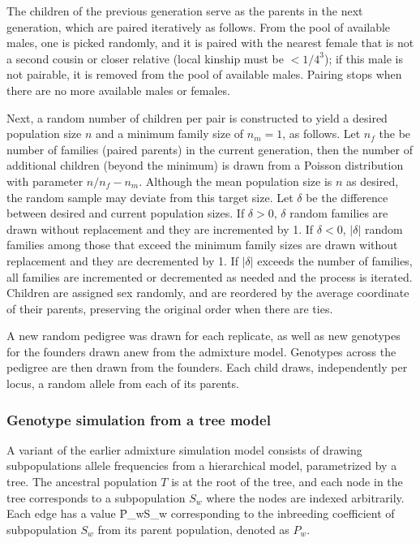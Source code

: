 \documentclass[11pt]{article}
\begin{document}
The children of the previous generation serve as the parents in the next generation, which are paired iteratively as follows.
From the pool of available males, one is picked randomly, and it is paired with the nearest female that is not a second cousin or closer relative (local kinship must be $< 1/4^3$); if this male is not pairable, it is removed from the pool of available males.
Pairing stops when there are no more available males or females.

Next, a random number of children per pair is constructed to yield a desired population size $n$ and a minimum family size of $n_m=1$, as follows.
Let $n_f$ the be number of families (paired parents) in the current generation, then the number of additional children (beyond the minimum) is drawn from a Poisson distribution with parameter $n/n_f - n_m$.
Although the mean population size is $n$ as desired, the random sample may deviate from this target size.
Let $\delta$ be the difference between desired and current population sizes.
If $\delta > 0$, $\delta$ random families are drawn without replacement and they are incremented by 1.
If $\delta < 0$, $|\delta|$ random families among those that exceed the minimum family sizes are drawn without replacement and they are decremented by 1.
If $|\delta|$ exceeds the number of families, all families are incremented or decremented as needed and the process is iterated.
Children are assigned sex randomly, and are reordered by the average coordinate of their parents, preserving the original order when there are ties.

A new random pedigree was drawn for each replicate, as well as new genotypes for the founders drawn anew from the admixture model.
Genotypes across the pedigree are then drawn from the founders.
Each child draws, independently per locus, a random allele from each of its parents.

\subsubsection{Genotype simulation from a tree model}

A variant of the earlier admixture simulation model consists of drawing subpopulations allele frequencies from a hierarchical model, parametrized by a tree.
The ancestral population $T$ is at the root of the tree, and each node in the tree corresponds to a subpopulation $S_w$ where the nodes are indexed arbitrarily.
Each edge has a value \f{P_w}{S_w} corresponding to the inbreeding coefficient of subpopulation $S_w$ from its parent population, denoted as $P_w$.
\end{document}
